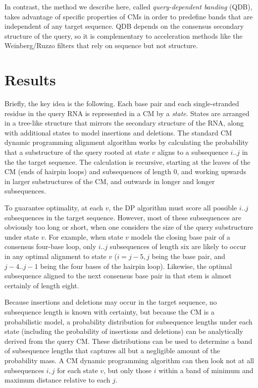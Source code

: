 \documentclass[11pt]{article}
\begin{document}
In contrast, the method we describe here, called \emph{query-dependent
banding} (QDB), takes advantage of specific properties of CMs in order
to predefine bands that are independent of any target sequence.  QDB
depends on the consensus secondary structure of the query, so it is
complementary to acceleration methods like the Weinberg/Ruzzo filters
that rely on sequence but not structure.



\section{Results}

Briefly, the key idea is the following. Each base pair and each
single-stranded residue in the query RNA is represented in a CM by a
\emph{state}. States are arranged in a tree-like structure that
mirrors the secondary structure of the RNA, along with additional
states to model insertions and deletions. The standard CM dynamic
programming alignment algorithm works by calculating the probability
that a substructure of the query rooted at state $v$ aligns to a
subsequence $i..j$ in the the target sequence. The calculation is
recursive, starting at the leaves of the CM (ends of hairpin loops)
and subsequences of length 0, and working upwards in larger
substructures of the CM, and outwards in longer and longer
subsequences.

To guarantee optimality, at each $v$, the DP algorithm must score all
possible $i..j$ subsequences in the target sequence.  However, most of
these subsequences are obviously too long or short, when one considers
the size of the query substructure under state $v$.  For example, when
state $v$ models the closing base pair of a consensus four-base loop,
only $i..j$ subsequences of length six are likely to occur in any
optimal alignment to state $v$ ($i=j-5,j$ being the base pair, and
$j-4..j-1$ being the four bases of the hairpin loop). Likewise, the
optimal subsequence aligned to the next consensus base pair in that stem is
almost certainly of length eight.

Because insertions and deletions may occur in the target sequence, no
subsequence length is known with certainty, but because the CM is a
probabilistic model, a probability distribution for subsequence
lengths under each state (including the probability of insertions and
deletions) can be analytically derived from the query CM.  These
distributions can be used to determine a band of subsequence lengths
that captures all but a negligible amount of the probability mass. A
CM dynamic programming algorithm can then look not at all subsequences
$i,j$ for each state $v$, but only those $i$ within a band of minimum
and maximum distance relative to each $j$.
\end{document}
